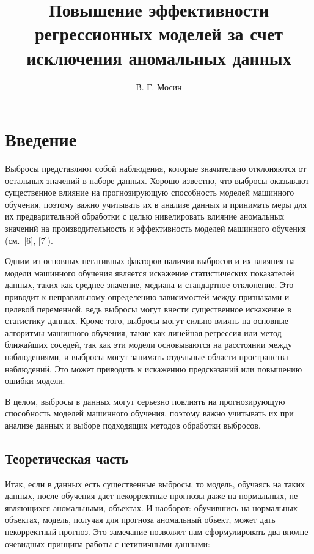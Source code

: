\documentclass[a4paper,12pt]{article}
\title{Повышение эффективности\\ регрессионных моделей за счет исключения аномальных данных}
\author{В. Г. Мосин}
\date{}
\begin{document}
	\maketitle
	
\tableofcontents
	
\section{Введение}
Выбросы представляют собой наблюдения, которые значительно отклоняются от остальных значений в наборе данных. Хорошо известно, что выбросы оказывают существенное влияние на прогнозирующую способность моделей машинного обучения, поэтому важно учитывать их в анализе данных и принимать меры для их предварительной обработки с целью нивелировать влияние аномальных значений на производительность и эффективность моделей машинного обучения (см. [6], [7]).

Одним из основных негативных факторов наличия выбросов и их влияния на модели машинного обучения является искажение статистических показателей данных, таких как среднее значение, медиана и стандартное отклонение. Это приводит к неправильному определению зависимостей между признаками и целевой переменной, ведь выбросы могут внести существенное искажение в статистику данных. Кроме того, выбросы могут сильно влиять на основные алгоритмы машинного обучения, такие как линейная регрессия или метод ближайших соседей, так как эти модели основываются на расстоянии между наблюдениями, и выбросы могут занимать отдельные области пространства наблюдений. Это может приводить к искажению предсказаний или повышению ошибки модели.

В целом, выбросы в данных могут серьезно повлиять на прогнозирующую способность моделей машинного обучения, поэтому важно учитывать их при анализе данных и выборе подходящих методов обработки выбросов.

\subsection{Теоретическая часть}

Итак, если в данных есть существенные выбросы, то модель, обучаясь на таких данных, после обучения дает некорректные прогнозы даже на нормальных, не являющихся аномальными, объектах. И наоборот: обучившись на нормальных объектах, модель, получая для прогноза аномальный объект, может дать некорректный прогноз. 
Это замечание позволяет нам сформулировать два вполне очевидных принципа работы с нетипичными данными:
\end{document}
